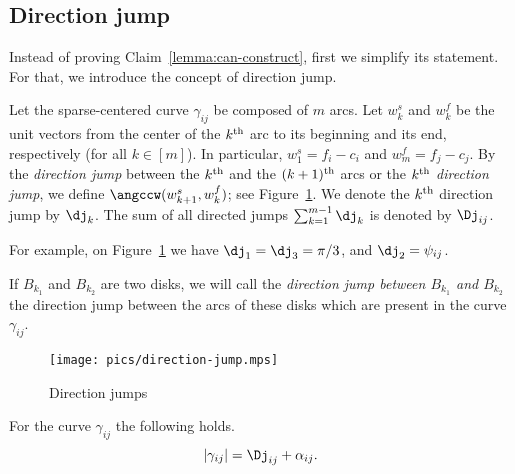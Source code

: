 
\subsection{Direction jump}

Instead of proving Claim~\ref{lemma:can-construct}, first we simplify its statement. For that, we introduce the concept of direction jump.

Let the sparse-centered curve $\gamma_{ij}$ be composed of $m$ arcs. Let $w_k^s$ and $w_k^f$ be the unit vectors from the center of the $k\textsuperscript{th}$ arc to its beginning and its end, respectively (for all $k\in[m]$). In particular, $w_1^s = f_i - c_i$ and $w_m^f = f_j - c_j$. By the \emph{direction jump} between the $k\textsuperscript{th}$ and the $(k+1)\textsuperscript{th}$ arcs or the \emph{$k\textsuperscript{th}$ direction jump}, we define $\angccw(w_{k+1}^s, w_k^f)$; see Figure~\ref{fig:direction-jumps}. We denote the $k\textsuperscript{th}$ direction jump by $\dj_k$. The sum of all directed jumps $\sum_{k=1}^{m-1}\dj_k$ is denoted by $\Dj_{ij}$.

For example, on Figure~\ref{fig:direction-jumps} we have $\dj_1 = \dj_3 = \pi/3$, and $\dj_2 = \psi_{ij}$.

If $B_{k_1}$ and $B_{k_2}$ are two disks, we will call the \emph{direction jump between $B_{k_1}$ and $B_{k_2}$} the direction jump between the arcs of these disks which are present in the curve $\gamma_{ij}$. %

\begin{figure}[h!]
    \centering
    \texttt{[image: pics/direction-jump.mps]}
    \caption{Direction jumps}
    \label{fig:direction-jumps}
\end{figure}

\begin{observation}
For the curve $\gamma_{ij}$ the following holds.
$$|\gamma_{ij}| = \Dj_{ij} + \alpha_{ij}.$$
\end{observation}

